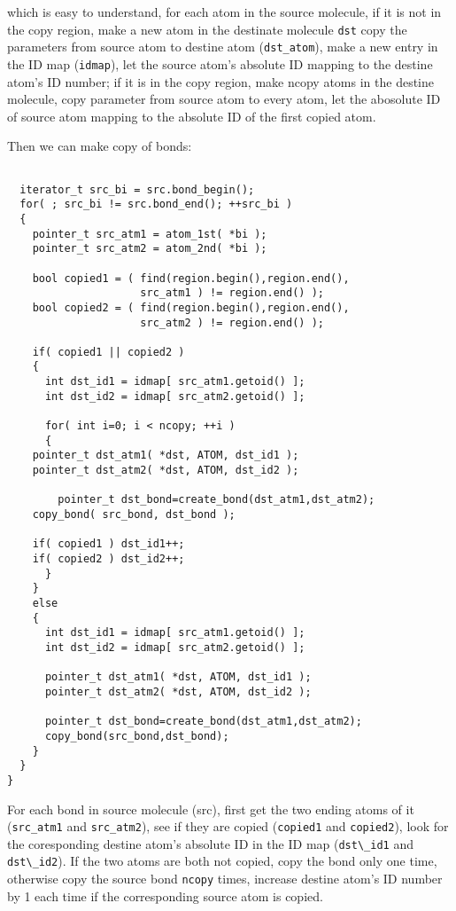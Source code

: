 \documentclass[letterpaper]{book}
\begin{document}
which is easy to understand, for each atom in the source molecule, if it is not in the copy
region, make a new atom in the destinate molecule \lstinline$dst$ copy the parameters from source atom to 
destine atom (\lstinline$dst_atom$), make a new entry in the ID map (\lstinline$idmap$), let the 
source atom's absolute ID mapping to the destine atom's ID number; if it is in the copy region, 
make ncopy atoms in the destine molecule, copy parameter from source atom to every atom, let the 
abosolute ID of source atom mapping to the absolute ID of the first copied atom.


Then we can make copy of bonds:


\begin{lstlisting}

  iterator_t src_bi = src.bond_begin();
  for( ; src_bi != src.bond_end(); ++src_bi )
  {
    pointer_t src_atm1 = atom_1st( *bi );
    pointer_t src_atm2 = atom_2nd( *bi );
    
    bool copied1 = ( find(region.begin(),region.end(),
                     src_atm1 ) != region.end() );
    bool copied2 = ( find(region.begin(),region.end(), 
                     src_atm2 ) != region.end() );

    if( copied1 || copied2 )
    {
      int dst_id1 = idmap[ src_atm1.getoid() ];
      int dst_id2 = idmap[ src_atm2.getoid() ];

      for( int i=0; i < ncopy; ++i )
      {
	pointer_t dst_atm1( *dst, ATOM, dst_id1 );
	pointer_t dst_atm2( *dst, ATOM, dst_id2 );

        pointer_t dst_bond=create_bond(dst_atm1,dst_atm2);
	copy_bond( src_bond, dst_bond );
			
	if( copied1 ) dst_id1++;
	if( copied2 ) dst_id2++;
      }
    }
    else
    {
      int dst_id1 = idmap[ src_atm1.getoid() ];
      int dst_id2 = idmap[ src_atm2.getoid() ];
      
      pointer_t dst_atm1( *dst, ATOM, dst_id1 );
      pointer_t dst_atm2( *dst, ATOM, dst_id2 );

      pointer_t dst_bond=create_bond(dst_atm1,dst_atm2);
      copy_bond(src_bond,dst_bond);
    }
  }
}

\end{lstlisting}

For each bond in source molecule (src), first get 
the two ending atoms of it (\lstinline$src_atm1$ and \lstinline$src_atm2$), see if they are 
copied (\lstinline$copied1$ and \lstinline$copied2$), look for the coresponding destine atom's 
absolute ID in the ID map (\lstinline$dst\_id1$ and \lstinline$dst\_id2$). If the two atoms are both not 
copied, copy the bond only one time, otherwise copy the source bond \lstinline$ncopy$ times, 
increase destine atom's ID number by 1 each time if the corresponding source atom is copied.
\end{document}
